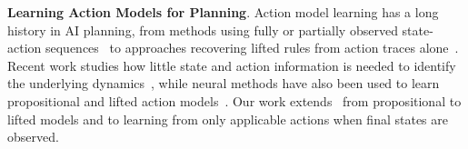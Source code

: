


\noindent \textbf{Learning Action Models for Planning}.
Action model learning has a long history in AI planning, from methods using fully or partially observed state-action sequences~\citep{zhuo2013action,aineto2019learning,lamanna2025lifted} to approaches recovering lifted rules from action traces alone~\citep{locm,sift}. Recent work studies how little state and action information is needed to identify the underlying dynamics~\citep{jansen2025incomplete,gosgens2026minimal}, while neural methods have also been used to learn propositional and lifted action models~\citep{asai:jair,xi2024neuro,xi2026unsupervised,ajith2026strips}.
Our work extends~\citet{nunez2026strips} from propositional to lifted \strips models and to learning from only applicable actions when final states are observed.

